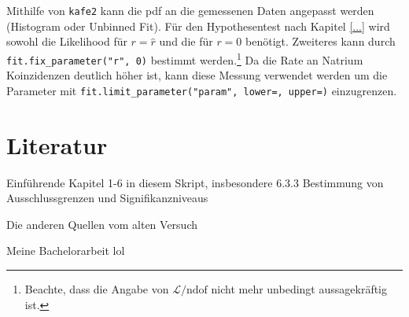Mithilfe von \texttt{kafe2} kann die pdf an die gemessenen Daten angepasst werden (Histogram oder Unbinned Fit). Für den Hypothesentest nach Kapitel \ref{...} wird sowohl die Likelihood für $r=\hat r$ und die für $r=0$ benötigt. Zweiteres kann durch \texttt{fit.fix\_parameter("r", 0)} bestimmt werden.\footnote{Beachte, dass die Angabe von $\mathcal{L}/\mathrm{ndof}$ nicht mehr unbedingt aussagekräftig ist.} Da die Rate an Natrium Koinzidenzen deutlich höher ist, kann diese Messung verwendet werden um die Parameter mit \texttt{fit.limit\_parameter("param", lower=, upper=)} einzugrenzen.


\section{Literatur}
Einführende Kapitel 1-6 in diesem Skript, insbesondere 6.3.3 Bestimmung von Ausschlussgrenzen und Signifikanzniveaus

Die anderen Quellen vom alten Versuch

Meine Bachelorarbeit lol